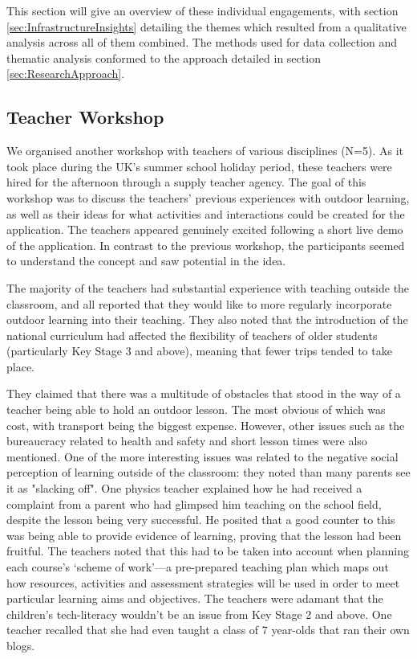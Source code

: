 This section will give an overview of these individual engagements, with section \ref{sec:InfrastructureInsights} detailing the themes which resulted from a qualitative analysis across all of them combined. The methods used for data collection and thematic analysis conformed to the approach detailed in section \ref{sec:ResearchApproach}. 

\subsection{Teacher Workshop}

We organised another workshop with teachers of various disciplines (N=5). As it took place during the UK's summer school holiday period, these teachers were hired for the afternoon through a supply teacher agency. The goal of this workshop was to discuss the teachers' previous experiences with outdoor learning, as well as their ideas for what activities and interactions could be created for the application. The teachers appeared genuinely excited following a short live demo of the application. In contrast to the previous workshop, the participants seemed to understand the concept and saw potential in the idea.

The majority of the teachers had substantial experience with teaching outside the classroom, and all reported that they would like to more regularly incorporate outdoor learning into their teaching. They also noted that the introduction of the national curriculum had affected the flexibility of teachers of older students (particularly Key Stage 3 and above), meaning that fewer trips tended to take place. 

They claimed that there was a multitude of obstacles that stood in the way of a teacher being able to hold an outdoor lesson. The most obvious of which was cost, with transport being the biggest expense. However, other issues such as the bureaucracy related to health and safety and short lesson times were also mentioned. One of the more interesting issues was related to the negative social perception of learning outside of the classroom: they noted than many parents see it as "slacking off". One physics teacher explained how he had received a complaint from a parent who had glimpsed him teaching on the school field, despite the lesson being very successful. He posited that a good counter to this was being able to provide evidence of learning, proving that the lesson had been fruitful. The teachers noted that this had to be taken into account when planning each course’s `scheme of work'---a pre-prepared teaching plan which maps out how resources, activities and assessment strategies will be used in order to meet particular learning aims and objectives. The teachers were adamant that the children’s tech-literacy wouldn’t be an issue from Key Stage 2 and above. One teacher recalled that she had even taught a class of 7 year-olds that ran their own blogs.

